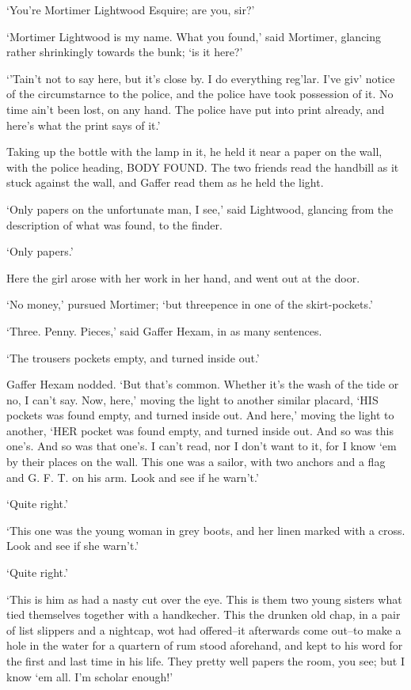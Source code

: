 ‘You’re Mortimer Lightwood Esquire; are you, sir?’

‘Mortimer Lightwood is my name. What you found,’ said Mortimer, glancing
rather shrinkingly towards the bunk; ‘is it here?’

‘’Tain’t not to say here, but it’s close by. I do everything reg’lar.
I’ve giv’ notice of the circumstarnce to the police, and the police have
took possession of it. No time ain’t been lost, on any hand. The police
have put into print already, and here’s what the print says of it.’

Taking up the bottle with the lamp in it, he held it near a paper on
the wall, with the police heading, BODY FOUND. The two friends read the
handbill as it stuck against the wall, and Gaffer read them as he held
the light.

‘Only papers on the unfortunate man, I see,’ said Lightwood, glancing
from the description of what was found, to the finder.

‘Only papers.’

Here the girl arose with her work in her hand, and went out at the door.

‘No money,’ pursued Mortimer; ‘but threepence in one of the
skirt-pockets.’

‘Three. Penny. Pieces,’ said Gaffer Hexam, in as many sentences.

‘The trousers pockets empty, and turned inside out.’

Gaffer Hexam nodded. ‘But that’s common. Whether it’s the wash of the
tide or no, I can’t say. Now, here,’ moving the light to another similar
placard, ‘HIS pockets was found empty, and turned inside out. And here,’
moving the light to another, ‘HER pocket was found empty, and turned
inside out. And so was this one’s. And so was that one’s. I can’t read,
nor I don’t want to it, for I know ‘em by their places on the wall. This
one was a sailor, with two anchors and a flag and G. F. T. on his arm.
Look and see if he warn’t.’

‘Quite right.’

‘This one was the young woman in grey boots, and her linen marked with a
cross. Look and see if she warn’t.’

‘Quite right.’

‘This is him as had a nasty cut over the eye. This is them two young
sisters what tied themselves together with a handkecher. This the
drunken old chap, in a pair of list slippers and a nightcap, wot had
offered--it afterwards come out--to make a hole in the water for a
quartern of rum stood aforehand, and kept to his word for the first and
last time in his life. They pretty well papers the room, you see; but I
know ‘em all. I’m scholar enough!’

